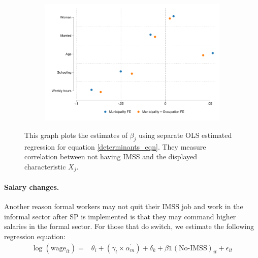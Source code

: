 \documentclass[oneside,11pt]{article}
\begin{document}
\vspace{.2in}
\begin{figure}[H]
     \caption{Characteristics and likelihood of not having IMSS coverage}
    \label{beta_characteristics_noimss}
\begin{center}
       \begin{subfigure}{0.55\textwidth}
        \includegraphics[width=\textwidth]{Figuras/beta_characteristics_noimss.pdf}
    \end{subfigure}
  \end{center}
    \scriptsize 
    This graph plots the estimates of $\beta_j$ using separate OLS estimated regression for equation \ref{determinants_eqn}. They measure correlation between not having IMSS and the displayed characteristic $X_j$.

\end{figure}




\paragraph{Salary changes.} Another reason formal workers may not quit their IMSS job and work in the informal sector after SP is implemented is that they may command higher salaries in the formal sector. For those that do switch, we estimate the following regression equation: 
\begin{align} 
    \log(\text{wage}_{it}) =&  \theta_i + (\gamma_t\times\alpha^\prime_m)  + \delta_k  + \beta\mathds{1}(\text{No-IMSS})_{it}+ \epsilon_{it}
\end{align}
\end{document}
